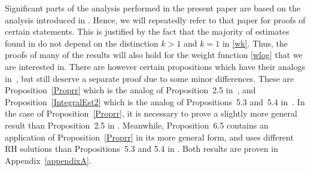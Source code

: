 Significant parts of the analysis performed in the present paper are based on the analysis introduced in \cite{CD}. Hence, we will repeatedly refer to that paper for proofs of certain statements. This is justified by the fact that the majority of estimates found in \cite{CD} do not depend on the distinction $k > 1$ and $k = 1$ in \eqref{wk}. Thus, the proofs of many of the results will also hold for the weight function \eqref{wlog} that we are interested in. There are however certain propositions which have their analogs in~\cite{CD}, but still deserve a separate proof due to some minor differences. These are Proposition~\ref{Proprr} which is the analog of Proposition~2.5 in~\cite{CD}, and Proposition~\ref{IntegralEst2} which is the analog of Propositions~5.3 and~5.4 in~\cite{CD}. In the case of Proposition~\ref{Proprr}, it is necessary to prove a slightly more general result than Proposition~2.5 in \cite{CD}. Meanwhile, Proposition~6.5 contains an application of Proposition~\ref{Proprr} in its more general form, and uses different RH solutions than Propositions~5.3 and 5.4 in \cite{CD}. Both results are proven in Appendix~\ref{appendixA}.

